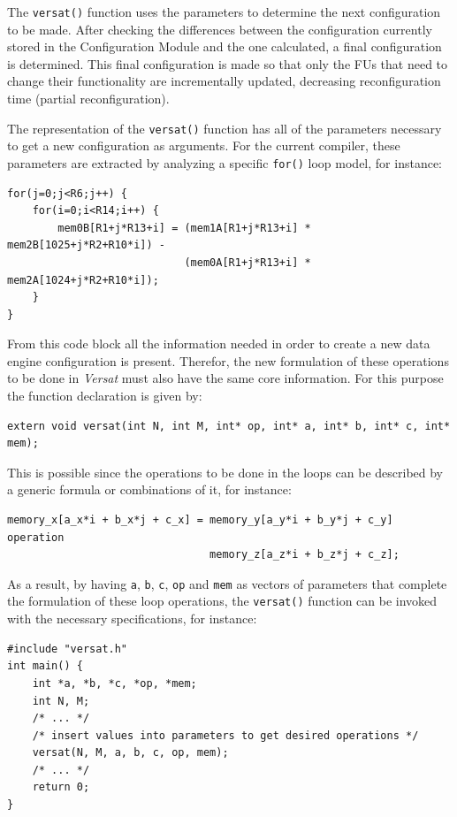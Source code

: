 The {\tt versat()} function uses the parameters to determine the next
configuration to be made.
After checking the differences between the configuration currently stored in
the Configuration Module and the one calculated, a final configuration is determined.
This final configuration is made so that only the FUs that need to change their
functionality are incrementally updated, decreasing reconfiguration time
(partial reconfiguration).

The representation of the {\tt versat()} function has all of the
parameters necessary to get a new configuration as arguments.
For the current compiler, these parameters are extracted by analyzing a specific
{\tt for()} loop model, for instance:
\begin{verbatim}
for(j=0;j<R6;j++) {
    for(i=0;i<R14;i++) {
        mem0B[R1+j*R13+i] = (mem1A[R1+j*R13+i] * mem2B[1025+j*R2+R10*i]) -
                            (mem0A[R1+j*R13+i] * mem2A[1024+j*R2+R10*i]);
    }
}
\end{verbatim}

From this code block all the information needed in order to create a new data engine
configuration is present.
Therefor, the new formulation of these operations to be done in {\it Versat} must also
have the same core information.
For this purpose the function declaration is given by:
\begin{verbatim}
extern void versat(int N, int M, int* op, int* a, int* b, int* c, int* mem);
\end{verbatim}

This is possible since the operations to be done in the loops can be described by
a generic formula or combinations of it, for instance:
\begin{verbatim}
memory_x[a_x*i + b_x*j + c_x] = memory_y[a_y*i + b_y*j + c_y] operation
                                memory_z[a_z*i + b_z*j + c_z];
\end{verbatim}

As a result, by having {\tt a}, {\tt b}, {\tt c}, {\tt op} and {\tt mem} as vectors of
parameters that complete the formulation of these loop operations, the {\tt versat()}
function can be invoked with the necessary specifications, for instance:
\begin{verbatim}
#include "versat.h"
int main() {
    int *a, *b, *c, *op, *mem;
    int N, M;
    /* ... */
    /* insert values into parameters to get desired operations */
    versat(N, M, a, b, c, op, mem);
    /* ... */
    return 0;
}
\end{verbatim}

